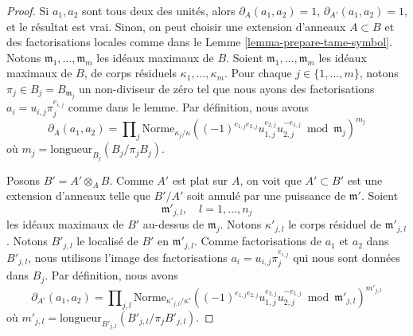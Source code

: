 \begin{proof}
Si $a_1, a_2$ sont tous deux des unités, alors $\partial_A(a_1, a_2) = 1$,
$\partial_{A'}(a_1, a_2) = 1$, et le résultat est vrai.
Sinon, on peut choisir une extension d'anneaux $A \subset B$ et
des factorisations locales comme dans le Lemme \ref{lemma-prepare-tame-symbol}.
Notons $\mathfrak m_1, \ldots, \mathfrak m_m$
les idéaux maximaux de $B$. Soient $\mathfrak m_1, \ldots, \mathfrak m_m$
les idéaux maximaux de $B$, de corps résiduels $\kappa_1, \ldots, \kappa_m$.
Pour chaque $j \in \{1, \ldots, m\}$, notons $\pi_j \in B_j = B_{\mathfrak m_j}$
un non-diviseur de zéro tel que nous ayons des factorisations
$a_i = u_{i, j}\pi_j^{e_{i, j}}$ comme dans le lemme.
Par définition, nous avons
$$
\partial_A(a_1, a_2) = \prod\nolimits_j
\text{Norme}_{\kappa_j/\kappa}
((-1)^{e_{1, j}e_{2, j}}u_{1, j}^{e_{2, j}}u_{2, j}^{-e_{1, j}}
\bmod \mathfrak m_j)^{m_j}
$$
où $m_j = \text{longueur}_{B_j}(B_j/\pi_j B_j)$.

\medskip\noindent
Posons $B' = A' \otimes_A B$. Comme $A'$ est plat sur $A$, on voit
que $A' \subset B'$ est une extension d'anneaux telle que $B'/A'$ soit annulé
par une puissance de $\mathfrak m'$. Soient
$$
\mathfrak m'_{j, l},\quad l = 1, \ldots, n_j
$$
les idéaux maximaux de $B'$ au-dessus de $\mathfrak m_j$. Notons
$\kappa'_{j, l}$ le corps résiduel de $\mathfrak m'_{j, l}$. Notons
$B'_{j, l}$ le localisé de $B'$ en $\mathfrak m'_{j, l}$.
Comme factorisations de $a_1$ et $a_2$ dans $B'_{j, l}$,
nous utilisons l'image des factorisations
$a_i = u_{i, j} \pi_j^{e_{i, j}}$ qui nous sont données dans $B_j$.
Par définition, nous avons
$$
\partial_{A'}(a_1, a_2) = \prod\nolimits_{j, l}
\text{Norme}_{\kappa'_{j, l}/\kappa'}
((-1)^{e_{1, j}e_{2, j}}u_{1, j}^{e_{2, j}}u_{2, j}^{-e_{1, j}}
\bmod \mathfrak m'_{j, l})^{m'_{j, l}}
$$
où $m'_{j, l} = \text{longueur}_{B'_{j, l}}(B'_{j, l}/\pi_j B'_{j, l})$.


\end{proof}
